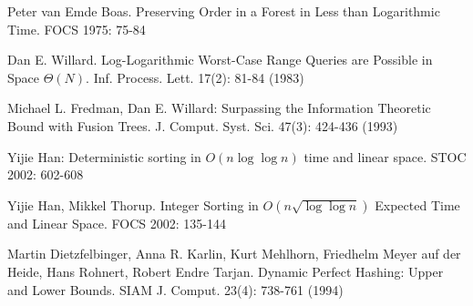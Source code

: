 \documentclass[11pt]{article}
\begin{document}
\begin{thebibliography}{42}

Peter van Emde Boas. Preserving Order in a Forest in Less than Logarithmic Time. FOCS 1975: 75-84

Dan E. Willard. Log-Logarithmic Worst-Case Range Queries are Possible in Space $\Theta(N)$. Inf. Process. Lett. 17(2): 81-84 (1983)

Michael L. Fredman, Dan E. Willard: Surpassing the Information Theoretic Bound with Fusion Trees. J. Comput. Syst. Sci. 47(3): 424-436 (1993)

Yijie Han: Deterministic sorting in $O(n \log \log n)$ time and linear space. STOC 2002: 602-608
 
Yijie Han, Mikkel Thorup. Integer Sorting in $O(n \sqrt{\log \log n})$ Expected Time and Linear Space. FOCS 2002: 135-144

Martin Dietzfelbinger, Anna R. Karlin, Kurt Mehlhorn, Friedhelm Meyer
auf der Heide, Hans Rohnert, Robert Endre Tarjan. Dynamic Perfect
Hashing: Upper and Lower Bounds. SIAM J. Comput. 23(4): 738-761 (1994)


\end{thebibliography}
\end{document}
